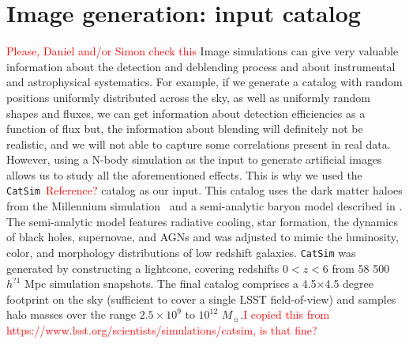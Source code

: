 \documentclass[\docopts]{\docclass}
\begin{document}
\section{Image generation: input catalog}
\label{sec:inputs}
\textcolor{red}{Please, Daniel and/or Simon check this}
Image simulations can give very valuable information about the detection and deblending process and about instrumental and astrophysical systematics. For example, if we generate a catalog with random positions uniformly distributed across the sky, as well as uniformly random shapes and fluxes, we can get information about detection efficiencies as a function of flux but, the information about blending will definitely not be realistic, and we will not able to capture some correlations present in real data. However, using a N-body simulation as the input to generate artificial images allows us to study all the aforementioned effects. This is why we used the \texttt{CatSim}~\textcolor{red}{Reference?} catalog as our input. This catalog uses the dark matter haloes from the Millennium simulation~\citep{2005Natur.435..629S} and a semi-analytic baryon model described in \citet{2006MNRAS.366..499D}. The semi-analytic model features radiative cooling, star formation, the dynamics of black holes, supernovae, and AGNs and was adjusted to mimic the luminosity, color, and morphology distributions of low redshift galaxies.  \texttt{CatSim} was generated by constructing a lightcone, covering redshifts $0<z<6$ from 58 500 $h^{?1}$ Mpc simulation snapshots. The final catalog comprises a 4.5$\times$4.5 degree footprint on the sky (sufficient to cover a single LSST field-of-view) and samples halo masses over the range $2.5\times10^{9}$ to $10^{12}$ $M_{\sun}$.\textcolor{red}{I copied this from https://www.lsst.org/scientists/simulations/catsim, is that fine?}
\end{document}
